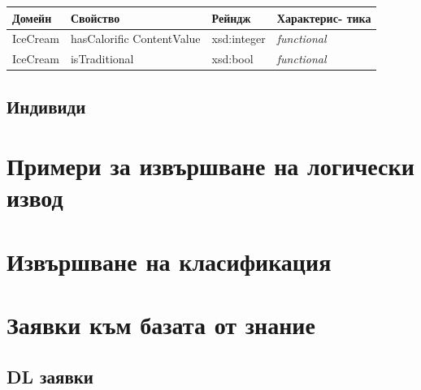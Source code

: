 \documentclass[12pt]{article}
\begin{document}
            \begin{table}[htbp]
                \centering
                \begin{tabularx}{\textwidth}{| X | X | X | X |}
                    \hline
                    \textbf{Домейн}          & \textbf{Свойство}     & \textbf{Рейндж}     & \textbf{Характерис- тика}         \\ \hline
                            
                    IceCream            & hasCalorific ContentValue & xsd:integer         &       \textit{functional}          \\ \hline
                    IceCream            & isTraditional & xsd:bool         &       \textit{functional}          \\ \hline
                            
                \end{tabularx}
            \end{table}
    
    
    
    
    \subsection{Индивиди}
    
    
    
    
    

\section{Примери за извършване на логически извод}








\section{Извършване на класификация}






\section{Заявки към базата от знание}

\subsection{DL заявки}
\end{document}
